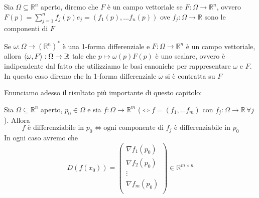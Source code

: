 \begin{definition}
Sia $\Omega \subseteq \mathbb{R}^n$ aperto, diremo che $F$ è un campo vettoriale se $F: \Omega \to \mathbb{R}^n$, ovvero $F(p) = \sum\limits_{j=1}^n f_j(p)e_j = (f_1(p), \ldots f_n(p))$ ove $f_j: \Omega \to \mathbb{R}$ sono le componenti di $F$
\end{definition}
\begin{remark}
Se $\omega: \Omega \to (\mathbb{R}^n)^{*}$ è una 1-forma differenziale e $F: \Omega \to \mathbb{R}^n$ è un campo vettoriale, allora $\langle \omega, F \rangle: \Omega \to \mathbb{R}$ tale che $p \mapsto \omega(p)F(p)$ è uno scalare, ovvero è indipendente dal fatto che utilizziamo le basi canoniche per rappresentare $\omega$ e $F$. In questo caso diremo che la 1-forma differenziale $\omega$ si è contratta su $F$
\end{remark}
Enunciamo adesso il risultato più importante di questo capitolo:
\begin{theorem}
Sia $\Omega \subseteq \mathbb{R}^n$ aperto, $p_0 \in \Omega$ e sia $f: \Omega \to \mathbb{R}^m$ ($\iff f=(f_1, \ldots f_m)$ con $f_j: \Omega \to \mathbb{R} \, \forall j$). Allora 
$$
f \text{ è differenziabile in } p_0 \iff \text{ogni componente di } f_j \text{ è differenziabile in } p_0
$$
In ogni caso avremo che
$$
D(f(x_0)) = \begin{pmatrix}
\nabla{f_1(p_0)} \\
\nabla{f_2(p_0)} \\
\vdots \\
\nabla{f_m(p_0)} \\
\end{pmatrix} \in \mathbb{R}^{m \times n}
$$
\end{theorem}
